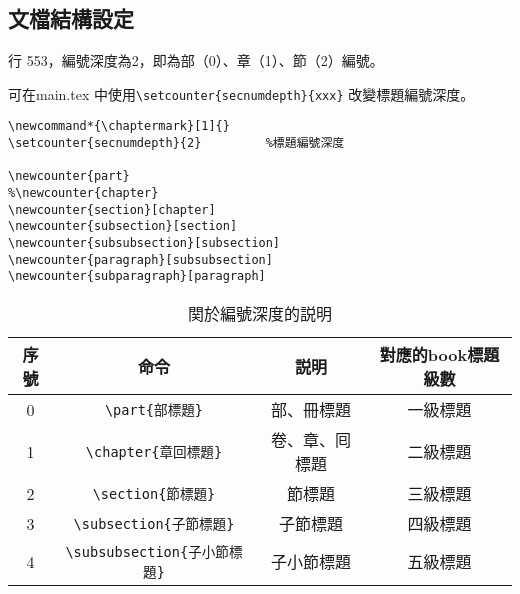 %
\subsection{文檔結構設定}

\par 行 553，編號深度為2，即為部（0）、章（1）、節（2）編號。
\par 可在main.tex 中使用\verb+\setcounter{secnumdepth}{xxx}+
改變標題編號深度。
%
\begin{lstlisting}[firstnumber=552]
\newcommand*{\chaptermark}[1]{}
\setcounter{secnumdepth}{2}			%標題編號深度

\newcounter{part}
%\newcounter{chapter}
\newcounter{section}[chapter]
\newcounter{subsection}[section]
\newcounter{subsubsection}[subsection]
\newcounter{paragraph}[subsubsection]
\newcounter{subparagraph}[paragraph]
\end{lstlisting}

\begin{table}[H]
\begin{center}
\caption{関於編號深度的説明}
\begin{tabular}{cccc}
\hline
序號 & 命令& 説明 & 對應的book標題級數 \\ \hline
0 & \verb+\part{部標題}+ & 部、冊標題 & 一級標題 \\
1 & \verb+\chapter{章回標題}+ & 卷、章、囘標題 & 二級標題  \\
2 & \verb+\section{節標題}+ & 節標題 & 三級標題 \\
3 & \verb+\subsection{子節標題}+ & 子節標題 & 四級標題 \\
4 & \verb+\subsubsection{子小節標題}+ & 子小節標題 & 五級標題 \\ \hline
\end{tabular}
\end{center}
\end{table}

